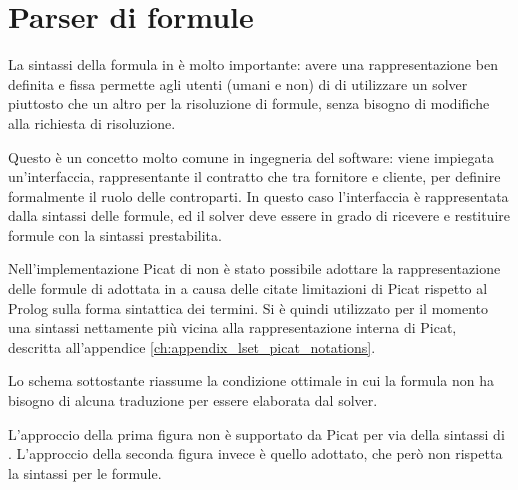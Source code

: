 \documentclass[12pt,a4paper,openright]{book} %
\begin{document}
\section{Parser di formule}
\label{sec:ext_formulas}

La sintassi della formula in \lset{} è molto importante: avere una
rappresentazione ben definita e fissa permette agli utenti (umani e
non) di \lset{} di utilizzare un solver piuttosto che un altro per la
risoluzione di formule, senza bisogno di modifiche alla richiesta di
risoluzione.

Questo è un concetto molto comune in ingegneria del software: viene
impiegata un'interfaccia, rappresentante il contratto che tra
fornitore e cliente, per definire formalmente il ruolo delle
controparti. In questo caso l'interfaccia è rappresentata dalla
sintassi delle formule, ed il solver deve essere in grado di ricevere
e restituire formule con la sintassi prestabilita.

Nell'implementazione Picat di \lset{} non è stato possibile adottare
la rappresentazione delle formule di \lset{} adottata in \setlog{} a
causa delle citate limitazioni di Picat rispetto al Prolog sulla forma
sintattica dei termini. Si è quindi utilizzato per il momento una
sintassi nettamente più vicina alla rappresentazione interna di Picat,
descritta all'appendice \ref{ch:appendix_lset_picat_notations}.

Lo schema sottostante riassume la condizione ottimale in cui la
formula non ha bisogno di alcuna traduzione per essere elaborata dal
solver.

\begin{figure}[H]
	\centering
	\begin{minipage}[b]{0.4\textwidth}
		\centering
		\label{fig:formula_lset_solver}
	\end{minipage}%
	\begin{minipage}[b]{0.4\textwidth}
		\centering
	\end{minipage}
\end{figure}
L'approccio della prima figura non è supportato da Picat per via della
sintassi di \lset{}. L'approccio della seconda figura invece è quello
adottato, che però non rispetta la sintassi \lset{} per le formule.
\end{document}
